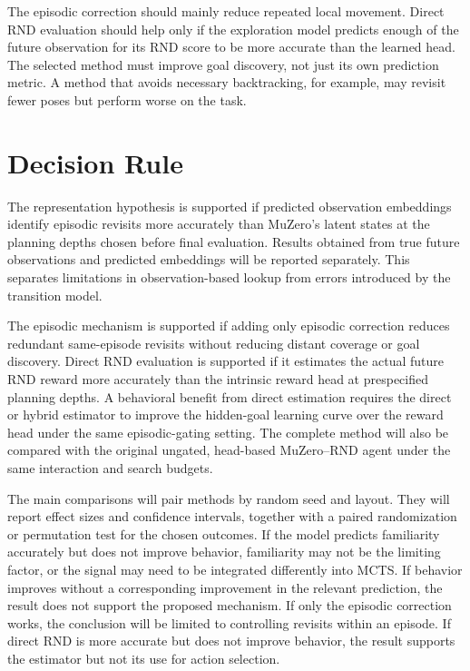 \documentclass{article}
\begin{document}
The episodic correction should mainly reduce repeated local movement. Direct
RND evaluation should help only if the exploration model predicts enough of the
future observation for its RND score to be more accurate than the learned
head. The selected method must improve goal discovery, not just its own
prediction metric. A method that avoids necessary backtracking, for example,
may revisit fewer poses but perform worse on the task.

\section{Decision Rule}

The representation hypothesis is supported if predicted observation embeddings
identify episodic revisits more accurately than MuZero's latent states at the
planning depths chosen before final evaluation. Results obtained from true
future observations and predicted embeddings will be reported separately. This
separates limitations in observation-based lookup from errors introduced by
the transition model.

The episodic mechanism is supported if adding only episodic correction reduces
redundant same-episode revisits without reducing distant coverage or goal
discovery. Direct RND evaluation is supported if it estimates the actual future
RND reward more accurately than the intrinsic reward head at prespecified
planning depths. A behavioral benefit from direct estimation requires the
direct or hybrid estimator to improve the hidden-goal learning curve over the
reward head under the same episodic-gating setting. The complete method will
also be compared with the original ungated, head-based MuZero--RND agent under
the same interaction and search budgets.

The main comparisons will pair methods by random seed and layout. They will
report effect sizes and confidence intervals, together with a paired
randomization or permutation test for the chosen outcomes. If the model
predicts familiarity accurately but does not improve behavior, familiarity may
not be the limiting factor, or the signal may need to be integrated differently
into MCTS. If behavior improves without a corresponding improvement in the
relevant prediction, the result does not support the proposed mechanism. If
only the episodic correction works, the conclusion will be limited to
controlling revisits within an episode. If direct RND is more accurate but does
not improve behavior, the result supports the estimator but not its use for
action selection.
\end{document}
